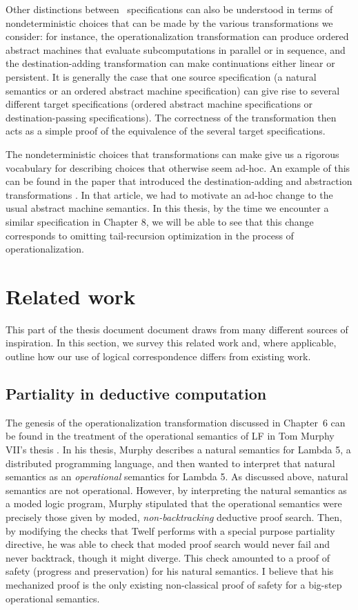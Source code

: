 Other distinctions between \sls~specifications can also be understood
in terms of nondeterministic choices that can be made by the various
transformations we consider: for instance, the operationalization
transformation can produce ordered abstract machines that evaluate
subcomputations in parallel or in sequence, and the
destination-adding transformation can make continuations either linear
or persistent. It is generally the case that one source
specification (a natural semantics or an ordered abstract machine
specification) can give rise to several different target
specifications (ordered abstract machine specifications or
destination-passing specifications). The correctness of the
transformation then acts as a simple proof of the equivalence of the
several target specifications.

The nondeterministic choices that transformations can make give us a
rigorous vocabulary for describing choices that otherwise seem
ad-hoc. An example of this can be found in the paper that introduced
the destination-adding and abstraction transformations
\cite{simmons11logical}. In that article, we had to motivate an ad-hoc
change to the usual abstract machine semantics. In this thesis, by the
time we encounter a similar specification in Chapter 8, we will be
able to see that this change corresponds to omitting tail-recursion
optimization in the process of operationalization.

\section{Related work}

This part of the thesis document document draws from many different
sources of inspiration. In this section, we survey this related work
and, where applicable, outline how our use of logical correspondence
differs from existing work.

\subsection*{Partiality in deductive computation}

The genesis of the operationalization transformation discussed in
Chapter~6 can be found in the treatment of the operational semantics
of LF in Tom Murphy VII's thesis \cite{murphy08modal}. In his thesis,
Murphy describes a natural semantics for Lambda 5, a distributed
programming language, and then wanted to interpret that natural
semantics as an {\it operational} semantics for Lambda 5. As discussed
above, natural semantics are not operational. However, by interpreting
the natural semantics as a moded logic program, Murphy stipulated that
the operational semantics were precisely those given by moded, {\it
  non-backtracking} deductive proof search. Then, by modifying the
checks that Twelf performs with a special purpose partiality
directive, he was able to check that moded proof search would never
fail and never backtrack, though it might diverge. This check amounted
to a proof of safety (progress and preservation) for his natural
semantics. I believe that his mechanized proof is the only existing
non-classical proof of safety for a big-step operational semantics.

